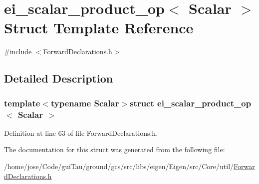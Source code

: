\hypertarget{structei__scalar__product__op}{\section{ei\-\_\-scalar\-\_\-product\-\_\-op$<$ Scalar $>$ Struct Template Reference}
\label{structei__scalar__product__op}
}


{\ttfamily \#include $<$Forward\-Declarations.\-h$>$}



\subsection{Detailed Description}
\subsubsection*{template$<$typename Scalar$>$struct ei\-\_\-scalar\-\_\-product\-\_\-op$<$ Scalar $>$}



Definition at line 63 of file Forward\-Declarations.\-h.



The documentation for this struct was generated from the following file\-:\begin{DoxyCompactItemize}
\item 
/home/jose/\-Code/gui\-Tau/ground/gcs/src/libs/eigen/\-Eigen/src/\-Core/util/\hyperlink{_forward_declarations_8h}{Forward\-Declarations.\-h}\end{DoxyCompactItemize}
